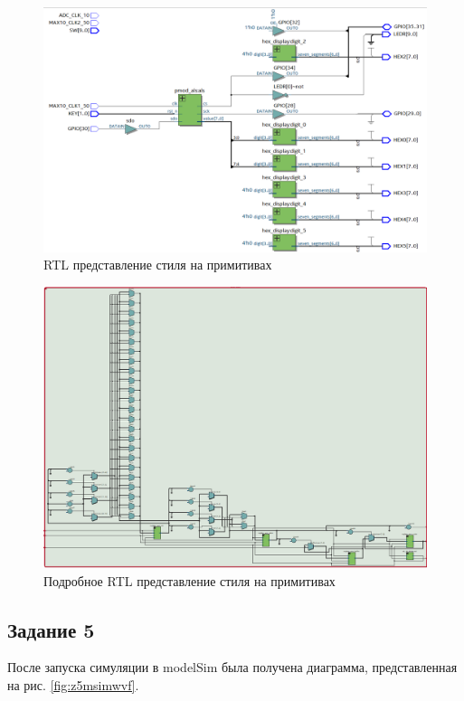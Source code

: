 \documentclass[a4paper,14pt]{article}
\begin{document}
	\begin{figure}[H]
		\centering
		\includegraphics[width=0.9\linewidth]{images/9_4_rtl}
		\caption{RTL представление стиля на примитивах}
		\label{fig:9_4_rtl}
	\end{figure}
	
	\begin{figure}[H]
		\centering
		\includegraphics[width=0.9\linewidth]{images/9_4_rtl2}
		\caption{Подробное RTL представление стиля на примитивах}
		\label{fig:9_4_rtl2}
	\end{figure}

	\subsection{Задание 5}
	
	После запуска симуляции в modelSim была получена диаграмма, представленная на рис. \ref{fig:z5msimwvf}.
	
\end{document}
